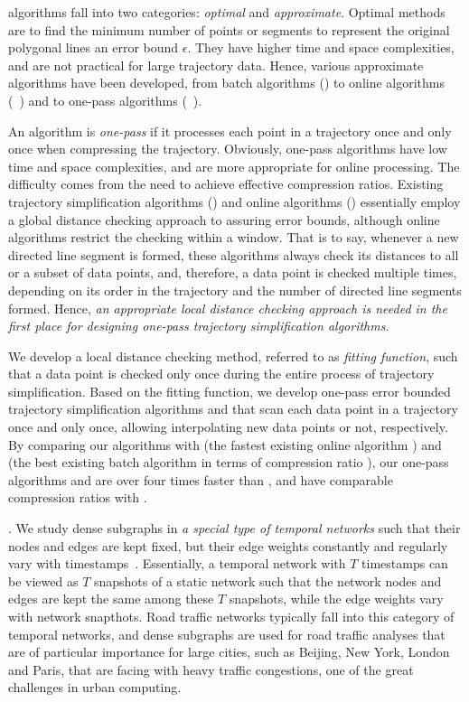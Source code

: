 \lsa algorithms fall into two categories: {\em optimal} and {\em approximate}.
Optimal methods\cite{Imai:Optimal} are to find the minimum number of points or segments to represent the original polygonal lines \wrt an error bound $\epsilon$. They have higher time and space complexities, and are not practical for large trajectory data.
Hence,  various approximate \lsa algorithms have been developed, from batch algorithms (\eg \cite{Douglas:Peucker}) to online algorithms (\eg~\cite{Liu:BQS}) and to one-pass algorithms (\eg~\cite{LinMZWH17}).


An \lsa algorithm is {\em one-pass} if it processes each point in a trajectory once and only once when compressing the trajectory.
Obviously, one-pass algorithms have low time and space complexities, and are more appropriate for online processing. The difficulty comes from the need to achieve effective compression ratios.
Existing trajectory simplification algorithms (\eg \cite{Douglas:Peucker}) and online algorithms  (\eg \cite{Liu:BQS}) essentially employ a global distance checking approach to assuring error bounds, although online algorithms restrict the checking within a window. That is to say, whenever a new directed line segment is formed, these algorithms always check its distances to all or a subset of data points, and, therefore, a data point is checked multiple times, depending on its order in the trajectory and the number of directed line segments formed. Hence, {\em an appropriate local distance checking approach is needed in the first place for designing one-pass trajectory simplification algorithms}.

 We develop a local distance checking method, referred to as  {\em fitting function}, such that a data point is checked only once during the entire process of trajectory simplification. Based on the fitting function, we develop one-pass error bounded trajectory simplification algorithms \operb and \operba that scan each data point in a trajectory once and only once, allowing interpolating new data points or not, respectively. By comparing our algorithms with \fbqsa (the fastest existing \lsa online algorithm \cite{Liu:BQS}) and \dpa (the best existing \lsa batch algorithm in terms of compression ratio \cite{Douglas:Peucker}), our one-pass algorithms  \operb and \operba are over four times faster than \fbqsa, and have  comparable compression ratios with \dpa.


.  We study dense subgraphs in {\em a special type of temporal networks} such that their nodes and edges are kept fixed, but their edge weights constantly and regularly vary with timestamps~\cite{MaHWLH17}.  Essentially, a temporal network with $T$ timestamps can be viewed as $T$ snapshots of a static network such that the network nodes and edges are kept the same among these $T$ snapshots, while the edge weights vary with network snapthots. Road traffic networks typically fall into this category of temporal networks, and dense subgraphs are used for road traffic analyses that are of particular importance for large cities, such as Beijing, New York, London and Paris, that are facing with heavy traffic congestions, one of the great challenges in urban computing.


